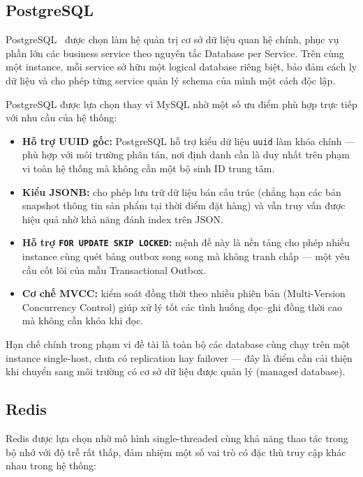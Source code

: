 \documentclass[../DoAn.tex]{subfiles}
\begin{document}
\subsection{PostgreSQL}

PostgreSQL~\cite{postgresql_docs} được chọn làm hệ quản trị cơ sở dữ liệu quan hệ chính, phục
vụ phần lớn các business service theo nguyên tắc Database per Service. Trên cùng một instance,
mỗi service sở hữu một logical database riêng biệt, bảo đảm cách ly dữ liệu và cho phép từng
service quản lý schema của mình một cách độc lập.

PostgreSQL được lựa chọn thay vì MySQL nhờ một số ưu điểm phù hợp trực tiếp với nhu cầu của
hệ thống:

\begin{itemize}[noitemsep]
    \item \textbf{Hỗ trợ UUID gốc:} PostgreSQL hỗ trợ kiểu dữ liệu \texttt{uuid} làm khóa
          chính --- phù hợp với môi trường phân tán, nơi định danh cần là duy nhất trên phạm
          vi toàn hệ thống mà không cần một bộ sinh ID trung tâm.
    \item \textbf{Kiểu JSONB:} cho phép lưu trữ dữ liệu bán cấu trúc (chẳng hạn các bản
          snapshot thông tin sản phẩm tại thời điểm đặt hàng) và vẫn truy vấn được hiệu quả
          nhờ khả năng đánh index trên JSON.
    \item \textbf{Hỗ trợ \texttt{FOR UPDATE SKIP LOCKED}:} mệnh đề này là nền tảng cho phép
          nhiều instance cùng quét bảng outbox song song mà không tranh chấp --- một yêu cầu
          cốt lõi của mẫu Transactional Outbox.
    \item \textbf{Cơ chế MVCC:} kiểm soát đồng thời theo nhiều phiên bản (Multi-Version
          Concurrency Control) giúp xử lý tốt các tình huống đọc--ghi đồng thời cao mà không
          cần khóa khi đọc.
\end{itemize}

Hạn chế chính trong phạm vi đề tài là toàn bộ các database cùng chạy trên một instance
single-host, chưa có replication hay failover --- đây là điểm cần cải thiện khi chuyển sang
môi trường có cơ sở dữ liệu được quản lý (managed database).

\subsection{Redis}

Redis được lựa chọn nhờ mô hình single-threaded cùng khả năng thao tác trong bộ nhớ với độ
trễ rất thấp, đảm nhiệm một số vai trò có đặc thù truy cập khác nhau trong hệ thống:
\end{document}
